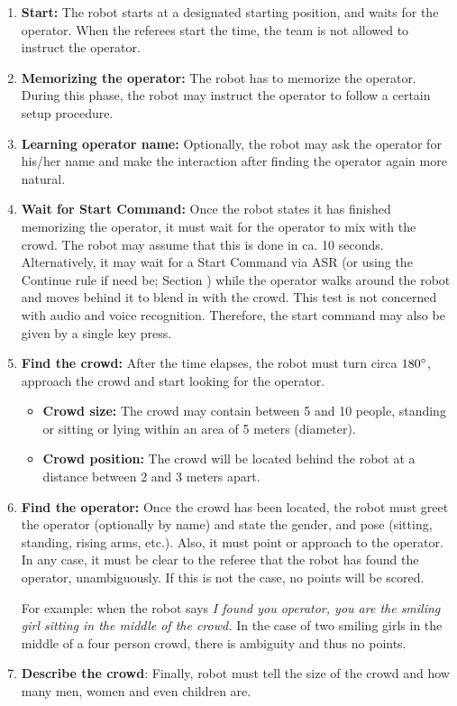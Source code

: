 \begin{enumerate}

\item \textbf{Start:} The robot starts at a designated starting position, and waits for the  operator. 
  When the referees start the time, the team is not allowed to instruct the operator.
\item \textbf{Memorizing the operator:} The robot has to memorize the operator. 
  During this phase, the robot may instruct the operator to follow a certain setup procedure.
\item \textbf{Learning operator name:} Optionally, the robot may ask the operator for his/her name and make the interaction after finding the operator again more natural.
\item \textbf{Wait for Start Command:} Once the robot states it has finished memorizing the operator, 
  it must wait for the operator to mix with the crowd. The robot may assume that this is done in ca. 10 seconds. 
  Alternatively, it may wait for a Start Command via ASR (or using the Continue rule if need be; Section ) while the operator walks around the robot and moves behind it to blend in with the crowd.
  This test is not concerned with audio and voice recognition. Therefore, the start command may also be given by a single key press.
\item \textbf{Find the crowd:} After the time elapses, the robot must turn circa $180\degree$, approach the crowd and start looking for the operator.
\begin{itemize}
\item \textbf{Crowd size:} The crowd may contain between 5 and 10 people, standing or sitting or lying within an  area of 5 meters (diameter).
\item \textbf{Crowd position:} The crowd will be located behind the robot at a distance between 2 and 3 meters apart.
\end{itemize}
\item \textbf{Find the operator:} Once the crowd has been located, the robot must greet the operator (optionally by name) and state the gender, and pose (sitting, standing, rising arms, etc.). 
  Also, it must point or approach to the operator. In any case, it must be clear to the referee that the robot has found the operator, unambiguously.
  If this is not the case, no points will be scored. 

  For example: when the robot says \textit{I found you operator, you are the smiling girl sitting in the middle of the crowd.}
  In the case of two smiling girls in the middle of a four person crowd, there is ambiguity and thus no points.

\item \textbf{Describe the crowd}: Finally, robot must tell the size of the crowd and how many men, women and even children are.
\end{enumerate}

